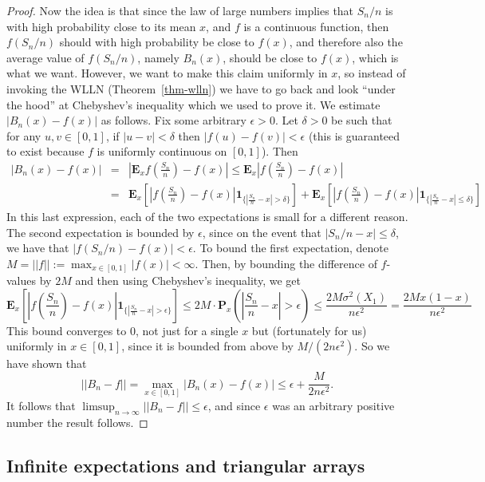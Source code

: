 \documentclass[12pt]{article}
\newcommand{\prob}{\mathbf{P}}
\newcommand{\expec}{\mathbf{E}}
\newcommand{\ind}{\textbf{1}}
\theoremstyle{example}
\begin{document}
\begin{proof}
Now the idea is that since the law of large numbers implies that $S_n/n$ is with high probability close to its mean $x$, and $f$ is a continuous function, then $f(S_n/n)$ should with high probability be close to $f(x)$, and therefore also the average value of $f(S_n/n)$, namely $B_n(x)$, should be close to $f(x)$, which is what we want. However, we want to make this claim uniformly in $x$, so instead of invoking the WLLN (Theorem~\ref{thm-wlln}) we have to go back and look ``under the hood'' at Chebyshev's inequality which we used to prove it. We estimate $|B_n(x)-f(x)|$ as follows. Fix some arbitrary $\epsilon>0$. Let $\delta>0$ be such that for any $u,v\in[0,1]$, if $|u-v|<\delta$ then $|f(u)-f(v)|<\epsilon$ (this is guaranteed to exist because $f$ is uniformly continuous on $[0,1]$). Then
\begin{eqnarray*}
|B_n(x)-f(x)|\!\!\! &=&\!\!\! \left|\expec_x f\left(\frac{S_n}{n}\right)-f(x)\right| \le \expec_x \left|f\left(\frac{S_n}{n}\right)-f(x)\right|
\\ &=&\!\!\! \expec_x \left[\left|f\left(\frac{S_n}{n}\right)-f(x)\right|\ind_{\{ \left|\frac{S_n}{n}-x\right|>\delta \}}\right] +
\expec_x \left[\left|f\left(\frac{S_n}{n}\right)-f(x)\right|\ind_{\{ \left|\frac{S_n}{n}-x\right|\le\delta \}}\right]
\end{eqnarray*}
In this last expression, each of the two expectations is small for a different reason.
The second expectation is bounded by $\epsilon$, since on the event that $|S_n/n-x|\le \delta$, we have that $|f(S_n/n)-f(x)|<\epsilon$. To bound the first expectation, denote $M=||f||:=\max_{x\in[0,1]}|f(x)|<\infty$. Then, by bounding the difference of $f$-values by $2M$ and then using Chebyshev's inequality, we get
$$ 
\expec_x \left[\left|f\left(\frac{S_n}{n}\right)-f(x)\right|\ind_{\{ \left|\frac{S_n}{n}-x\right|>\epsilon \}} \right]
\le 2M\cdot \prob_x\!\left( \left|\frac{S_n}{n}-x\right|>\epsilon\right) 
\le \frac{2 M \sigma^2(X_1)}{n \epsilon^2} = \frac{2 M x(1-x)}{n\epsilon^2}
$$
This bound converges to $0$, not just for a single $x$ but (fortunately for us) uniformly in $x\in[0,1]$, since it is bounded from above by $M/(2n\epsilon^2)$. So we have shown that
$$ ||B_n-f|| = \max_{x\in[0,1]} |B_n(x)-f(x)| \le
\epsilon + \frac{M}{2n\epsilon^2}. $$
It follows that $\limsup_{n\to\infty} ||B_n-f|| \le \epsilon$, and since $\epsilon$ was an arbitrary positive number the result follows.
\end{proof}

\subsection{Infinite expectations and triangular arrays}
\end{document}
